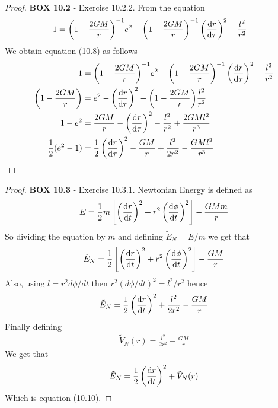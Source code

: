 \documentclass[11pt]{article}
\theoremstyle{definition}
\begin{document}
\begin{proof}{\textbf{BOX 10.2} - Exercise 10.2.2.}
    From the equation
    \begin{align*}
        1 &= \bigg(1 - \frac{2GM}{r}\bigg)^{-1}e^2
        - \bigg(1 - \frac{2GM}{r}\bigg)^{-1}\left(\dv{r}{\tau}\right)^2
        - \frac{l^2}{r^2}
    \end{align*}
    We obtain equation (10.8) as follows
    \begin{align*}
        1 &= \bigg(1 - \frac{2GM}{r}\bigg)^{-1}e^2
        - \bigg(1 - \frac{2GM}{r}\bigg)^{-1}\left(\dv{r}{\tau}\right)^2
        - \frac{l^2}{r^2}\\
        \bigg(1 - \frac{2GM}{r}\bigg) &= e^2
        - \left(\dv{r}{\tau}\right)^2
        - \bigg(1 - \frac{2GM}{r}\bigg)\frac{l^2}{r^2}\\
        1 - e^2 &= \frac{2GM}{r}
        - \left(\dv{r}{\tau}\right)^2
        - \frac{l^2}{r^2} + \frac{2GMl^2}{r^3}\\
        \frac{1}{2}(e^2 - 1) &=
        \frac{1}{2}\left(\dv{r}{\tau}\right)^2
        - \frac{GM}{r}
        + \frac{l^2}{2r^2} - \frac{GMl^2}{r^3}
    \end{align*}
\end{proof}
\cleardoublepage
\begin{proof}{\textbf{BOX 10.3} - Exercise 10.3.1.}
    Newtonian Energy is defined as
    \begin{align*}
        E = \frac{1}{2}m\left[\left(\dv{r}{t}\right)^2 + r^2\left(\dv{\phi}{t}\right)^2\right]
        - \frac{GMm}{r}
    \end{align*}
    So dividing the equation by $m$ and defining $\tilde{E}_N = E/m$ we get
    that
    \begin{align*}
        \tilde{E}_N = \frac{1}{2}
        \left[\left(\dv{r}{t}\right)^2 + r^2\left(\dv{\phi}{t}\right)^2\right]
        - \frac{GM}{r}
    \end{align*}
    Also, using $l = r^2 d\phi/dt$ then $r^2(d\phi/dt)^2 = l^2/r^2$ hence
    \begin{align*}
        \tilde{E}_N = \frac{1}{2}\left(\dv{r}{t}\right)^2 + \frac{l^2}{2r^2}
        - \frac{GM}{r}
    \end{align*}
    Finally defining
    \begin{align*}
        \tilde{V}_N(r) = \frac{l^2}{2r^2} - \frac{GM}{r}
    \end{align*}
    We get that
    \begin{align*}
        \tilde{E}_N = \frac{1}{2}\left(\dv{r}{t}\right)^2 + \tilde{V}_N(r)
    \end{align*}
    Which is equation (10.10).
\end{proof}
\end{document}
